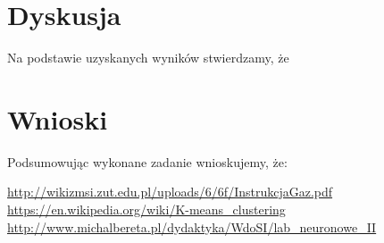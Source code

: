 \documentclass{classrep}
\begin{document}
\section{Dyskusja}
{
	Na podstawie uzyskanych wyników stwierdzamy, że
}

\section{Wnioski}
{
	Podsumowując wykonane zadanie wnioskujemy, że:\\
}

\begin{thebibliography}{0}
  \url{ http://wikizmsi.zut.edu.pl/uploads/6/6f/InstrukcjaGaz.pdf}
   \url{https://en.wikipedia.org/wiki/K-means\_clustering}
   \url{http://www.michalbereta.pl/dydaktyka/WdoSI/lab_neuronowe_II}
\end{thebibliography}

{

}
\end{document}
